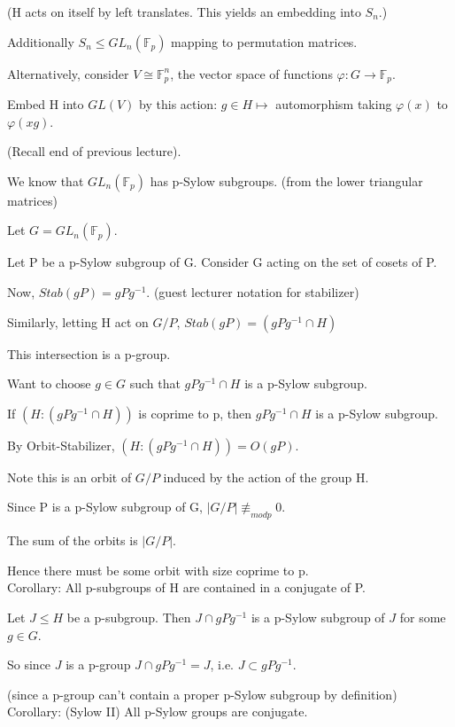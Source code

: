 \documentclass[12pt]{article}
\newcommand{\inv}{^{-1}}
\begin{document}
(H acts on itself by left translates.  This yields an embedding into $S_n$.)

Additionally $S_n \leq GL_n(\mathds{F}_p)$ mapping to permutation matrices.

Alternatively, consider $V \cong \mathds{F}_p^n$, the vector space of functions $\varphi : G \to \mathds{F}_p$.

Embed H into $GL(V)$ by this action: $g \in H \mapsto$ automorphism taking $\varphi(x)$ to $\varphi(xg)$.

(Recall end of previous lecture).

We know that $GL_n(\mathds{F}_p)$ has p-Sylow subgroups.  (from the lower triangular matrices)

Let $G = GL_n(\mathds{F}_p)$.

Let P be a p-Sylow subgroup of G.  Consider G acting on the set of cosets of P.

Now, $Stab(gP) = gPg^{-1}$. (guest lecturer notation for stabilizer)

Similarly, letting H act on $G \slash P$, $Stab(gP) = (gPg^{-1} \cap H)$

This intersection is a p-group.

Want to choose $g \in G$ such that $gPg^{-1} \cap H$ is a p-Sylow subgroup.

If $(H : (gPg^{-1} \cap H))$ is coprime to p, then $gPg^{-1} \cap H$ is a p-Sylow subgroup.

By Orbit-Stabilizer, $(H : (gPg^{-1} \cap H)) = O(gP)$.

Note this is an orbit of $G/P$ induced by the action of the group H.

Since P is a p-Sylow subgroup of G, $|G\slash P| \not\equiv_{mod p} 0$.

The sum of the orbits is $|G \slash P|$.

Hence there must be some orbit with size coprime to p.\\

\noindent
Corollary: All p-subgroups of H are contained in a conjugate of P.

Let $J \leq H$ be a p-subgroup.  Then $J \cap gPg\inv$ is a p-Sylow subgroup of $J$ for some $g \in G$.

So since $J$ is a p-group $J \cap gPg\inv = J$, i.e. $J \subset gPg\inv$.

(since a p-group can't contain a proper p-Sylow subgroup by definition)\\

\noindent
Corollary: (Sylow II) All p-Sylow groups are conjugate.
\end{document}
